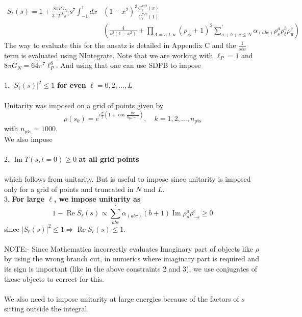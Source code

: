 ﻿\documentclass[12pt,a4paper]{article}
\begin{document}
$$
\begin{aligned}
S_{\ell}(s)=1+\frac{8\pi i G_{N}}{3 \cdot 2^{18} \pi^{4}} s^{7} \int_{-1}^{1} d x&\left(1-x^{2}\right)^{3} \frac{C_{\ell}^{7 / 2}(x)}{C_{\ell}^{7 / 2}(1)}\\
&\left(\frac{4}{s^{3}(1-x^{2})}+\prod_{A=s, t, u}\left(\rho_{A}+1\right)^{2} \sum_{a+b+c \leq N}^{\prime} \alpha_{(a b c)} \rho_{s}^{a} \rho_{t}^{b} \rho_{u}^{c}\right)
\end{aligned}
$$
The way to evaluate this for the ansatz is detailed in Appendix C and the $\frac{1}{stu}$ term is evaluated using NIntegrate. Note that we are working with $\ell_{P}=1$ and $8 \pi G_{N}=64 \pi^{7} \ell_{P}^{8}$. And using that one can use SDPB to impose\\\\
1. $\left|S_{\ell}(s)\right|^{2} \leq 1$\textbf{ for even} $\ell=0,2,..., L$\\\\
Unitarity was imposed on a grid of points given by
$$
\rho\left(s_{k}\right)=e^{i \frac{\pi}{2}\left(1+\cos \frac{\pi k}{n_{\mathrm{pts}}+1}\right)}, \quad k=1,2,..., n_{\mathrm{pts}}
$$
with $n_{\mathrm{pts}}=1000$.\\
We also impose \\\\
2. $\operatorname{Im} T(s, t=0) \geq 0$ \textbf{at all grid points}\\\\
which follows from unitarity. But is useful to impose since unitarity is imposed only for a grid of points and truncated in $N$ and $L$.\\
3. \textbf{For large $\ell$, we impose unitarity as}
$$
1-\operatorname{Re} S_{\ell}(s) \propto \sum_{a b c}^{\prime} \alpha_{(a b c)}(b+1) \operatorname{Im} \rho_{s}^{a} \rho_{-s}^{c} \geq 0
$$
since $\left| S_{\ell}(s)\right|^{2}\leq 1 \Rightarrow \operatorname{Re} S_{\ell}(s)\leq 1$.\\\\
NOTE:- Since Mathematica incorrectly evaluates Imaginary part of objects like $\rho$ by using the wrong branch cut, in numerics where imaginary part is required and its sign is important (like in the above constraints 2 and 3), we use conjugates of those objects to correct for this.\\\\
We also need to impose unitarity at large energies because of the factors of $s$ sitting outside the integral.
\end{document}

